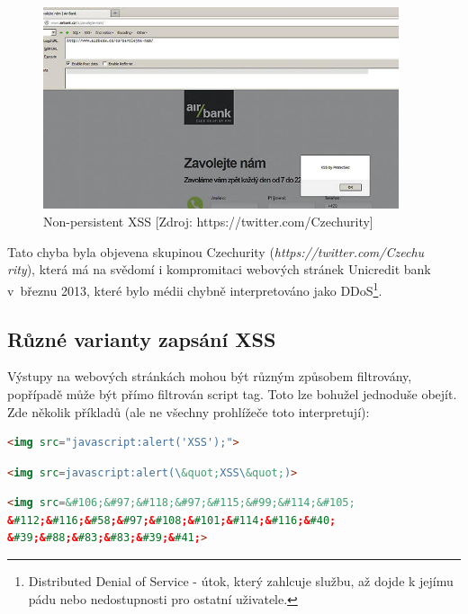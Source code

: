 \begin{figure}[h!]
\includegraphics[width=395px]{./examples/xss-airbank2.png}
\caption{Non-persistent XSS [Zdroj: https://twitter.com/Czechurity]}
\label{obr.airbank}
\end{figure}

Tato chyba byla objevena skupinou Czechurity (\textit{https://twitter.com/Czechu\\rity}), která má na svědomí i kompromitaci webových stránek Unicredit bank v~březnu 2013, které bylo médii chybně interpretováno jako DDoS\footnote{Distributed Denial of Service - útok, který zahlcuje službu, až dojde k jejímu pádu nebo nedostupnosti pro ostatní uživatele.}.

\subsection{Různé varianty zapsání XSS}
Výstupy na webových stránkách mohou být různým způsobem filtrovány, popřípadě může být přímo filtrován script tag. Toto lze bohužel jednoduše obejít\cite{soom.cz}. Zde několik příkladů (ale ne všechny prohlížeče toto interpretují):

\begin{lstlisting}[label=FakeImageXSS, language=HTML, caption=Schování JavaScriptu do neexistujícího obrázku]
<img src="javascript:alert('XSS');">
\end{lstlisting}

\begin{lstlisting}[label=EntityXSSReplace, language=HTML, caption=Zakázané uvozovky? Nahrazení entitami \ldots]
<img src=javascript:alert(\&quot;XSS\&quot;)>
\end{lstlisting}

\begin{lstlisting}[label=unicodeXSSFormat, language=HTML, caption=Další možností je převedení na unikód]
<img src=&#106;&#97;&#118;&#97;&#115;&#99;&#114;&#105;
&#112;&#116;&#58;&#97;&#108;&#101;&#114;&#116;&#40;
&#39;&#88;&#83;&#83;&#39;&#41;>
\end{lstlisting}

